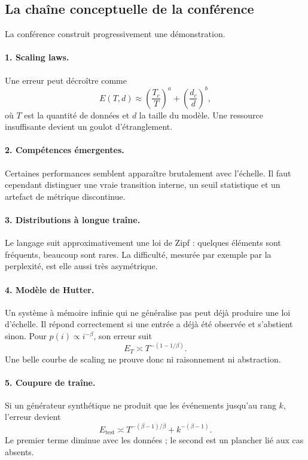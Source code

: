 \subsection{La chaîne conceptuelle de la conférence}

La conférence construit progressivement une démonstration.

\paragraph{1. Scaling laws.} Une erreur peut décroître comme
\[
E(T,d) \approx \left(\frac{T_c}{T}\right)^a + \left(\frac{d_c}{d}\right)^b,
\]
où $T$ est la quantité de données et $d$ la taille du modèle. Une ressource insuffisante devient un goulot d'étranglement.

\paragraph{2. Compétences émergentes.} Certaines performances semblent apparaître brutalement avec l'échelle. Il faut cependant distinguer une vraie transition interne, un seuil statistique et un artefact de métrique discontinue.

\paragraph{3. Distributions à longue traîne.} Le langage suit approximativement une loi de Zipf : quelques éléments sont fréquents, beaucoup sont rares. La difficulté, mesurée par exemple par la perplexité, est elle aussi très asymétrique.

\paragraph{4. Modèle de Hutter.} Un système à mémoire infinie qui ne généralise pas peut déjà produire une loi d'échelle. Il répond correctement si une entrée a déjà été observée et s'abstient sinon. Pour $p(i)\propto i^{-\beta}$, son erreur suit
\[
E_T \asymp T^{-(1-1/\beta)}.
\]
Une belle courbe de scaling ne prouve donc ni raisonnement ni abstraction.

\paragraph{5. Coupure de traîne.} Si un générateur synthétique ne produit que les événements jusqu'au rang $k$, l'erreur devient
\[
E_{\mathrm{test}} \asymp T^{-(\beta-1)/\beta} + k^{-(\beta-1)}.
\]
Le premier terme diminue avec les données ; le second est un plancher lié aux cas absents.

